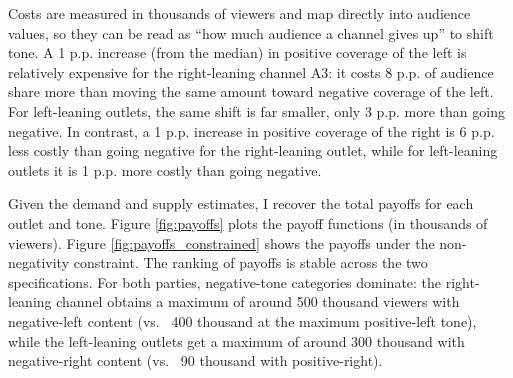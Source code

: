 \documentclass[12pt]{article}
\begin{document}


Costs are measured in thousands of viewers and map directly into audience values, so they can be read as “how much audience a channel gives up” to shift tone. A 1 p.p. increase (from the median) in positive coverage of the left is relatively expensive for the right-leaning channel A3: it costs 8 p.p. of audience share  more than moving the same amount toward negative coverage of the left. For left-leaning outlets, the same shift is far smaller, only 3 p.p. more than going negative. In contrast, a 1 p.p. increase in positive coverage of the right is 6 p.p. less costly than going negative for the right-leaning outlet, while for left-leaning outlets it is 1 p.p. more costly than going negative. 



Given the demand and supply estimates, I recover the total payoffs for each outlet and tone.  Figure \ref{fig:payoffs} plots the payoff functions (in thousands of viewers). Figure \ref{fig:payoffs_constrained} shows the payoffs under the non-negativity constraint. The ranking of payoffs is stable across the two specifications. For both parties, negative-tone categories dominate: the right-leaning channel obtains a maximum of  around 500 thousand viewers with negative-left content (vs. ~400 thousand at the maximum positive-left tone), while the left-leaning outlets get a maximum of around 300 thousand with negative-right content (vs. ~90 thousand with positive-right).

\end{document}
